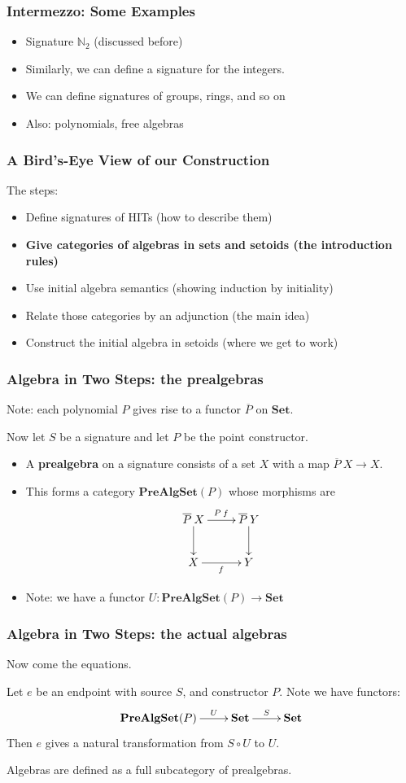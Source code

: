 \documentclass{beamer}
\newcommand{\sets}{\mathbf{Set}}
\newcommand{\prealgsets}{\mathbf{PreAlgSet}}
\begin{document}
\begin{frame}
\frametitle{Intermezzo: Some Examples}
\begin{itemize}
	\item Signature $\mathbb{N}_2$ (discussed before)
	\item Similarly, we can define a signature for the integers.
	\item We can define signatures of groups, rings, and so on
	\item Also: polynomials, free algebras
\end{itemize}
\end{frame}

\begin{frame}
\frametitle{A Bird's-Eye View of our Construction}
The steps:
\begin{itemize}
	\item Define signatures of HITs (how to describe them)
	\item \textbf{Give categories of algebras in sets and setoids (the introduction rules)}
	\item Use initial algebra semantics (showing induction by initiality)
	\item Relate those categories by an adjunction (the main idea)
	\item Construct the initial algebra in setoids (where we get to work)
\end{itemize}
\end{frame}

\begin{frame}
\frametitle{Algebra in Two Steps: the \textbf{pre}algebras}
Note: each polynomial $P$ gives rise to a functor $\overline{P}$ on $\sets$.

Now let $S$ be a signature and let $P$ be the point constructor.
\begin{itemize}
	\item A \textbf{prealgebra} on a signature consists of a set $X$ with a map $\overline{P} \> X \rightarrow X$.
	\item This forms a category $\prealgsets(P)$ whose morphisms are
	\[
	\xymatrix
	{
		\overline{P} \> X \ar[d] \ar[r]^{P \> f} & \overline{P} \> Y \ar[d]\\
		X \ar[r]_f & Y 
	}
	\]
	\item Note: we have a functor $U : \prealgsets(P) \rightarrow \sets$
\end{itemize}
\end{frame}

\begin{frame}
\frametitle{Algebra in Two Steps: the \textbf{actual} algebras}
Now come the equations.

Let $e$ be an endpoint with source $S$, and constructor $P$.
Note we have functors:
\[
\xymatrix
{
	\prealgsets(P) \ar[r]^-{U} & \sets \ar[r]^{S} & \sets 
}
\]
Then $e$ gives a natural transformation from $S \circ U$ to $U$.

Algebras are defined as a full subcategory of prealgebras.
\end{frame}
\end{document}
